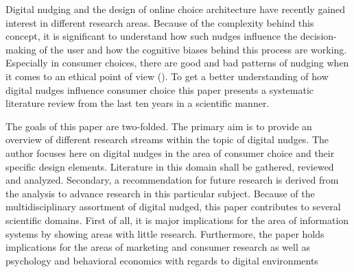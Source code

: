 Digital nudging and the design of online choice architecture have recently gained interest in different research areas. Because of the complexity behind this concept, it is significant to understand how such nudges influence the decision-making of the user and how the cognitive biases behind this process are working. Especially in consumer choices, there are good and bad patterns of nudging when it comes to an ethical point of view (\cite{sunstein_nudging_2015}). To get a better understanding of how digital nudges influence consumer choice this paper presents a systematic literature review from the last ten years in a scientific manner. 


The goals of this paper are two-folded. The primary aim is to provide an overview of different research streams within the topic of digital nudges. The author focuses here on digital nudges in the area of consumer choice and their specific design elements.  Literature in this domain shall be gathered, reviewed and analyzed. Secondary, a recommendation for future research is derived from the analysis to advance research in this particular subject. Because of the multidisciplinary assortment of digital nudged, this paper contributes to several scientific domains. First of all, it is major implications for the area of information systems by showing areas with little research. Furthermore, the paper holds implications for the areas of marketing and consumer research as well as psychology and behavioral economics with regards to digital environments
